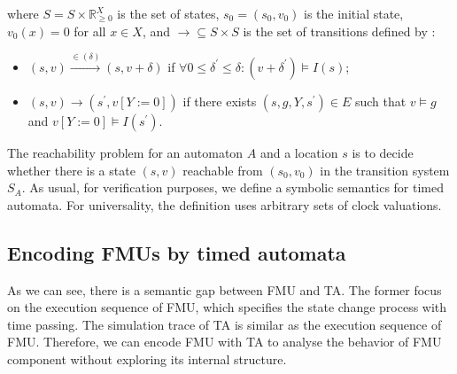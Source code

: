 where $S = S \times \mathbb{R}_{\geqslant{0}}^X$ is the set of states, $s_{0} = (s_{0},v_{0})$ is the initial state, $v_{0}(x) = 0$ for all $x \in X$, and $\rightarrow \subseteq S \times S$ is the set of transitions defined by :
\begin{itemize}
\item
$(s,v) \xrightarrow{\in(\delta)} (s,v+\delta)$ if $\forall0 \leqslant \delta^{\prime} \leqslant \delta : (v + \delta^{\prime}) \models I(s)$;
\item
$(s,v) \rightarrow(s^{\prime},v[Y := 0])$ if there exists $(s,g,Y,s^{\prime}) \in E$ such that $v \models g$ and $v[Y := 0 ] \models I(s^{\prime})$.
\end{itemize}
The reachability problem for an automaton $A$ and a location $s$ is to decide whether there is a state $(s,v)$ reachable from $(s_{0},v_{0})$ in the transition system $S_{A}$. As usual, for verification purposes, we define a symbolic semantics for timed automata. For universality, the definition uses arbitrary sets of clock valuations.
\subsection{Encoding FMUs by timed automata}
As we can see, there is a semantic gap between FMU and TA. The former focus on the execution sequence of FMU, which specifies the state change process with time passing. The simulation trace of TA is similar as the execution sequence of FMU. Therefore, we can encode FMU with TA to analyse the behavior of FMU component without 
exploring its internal structure.


